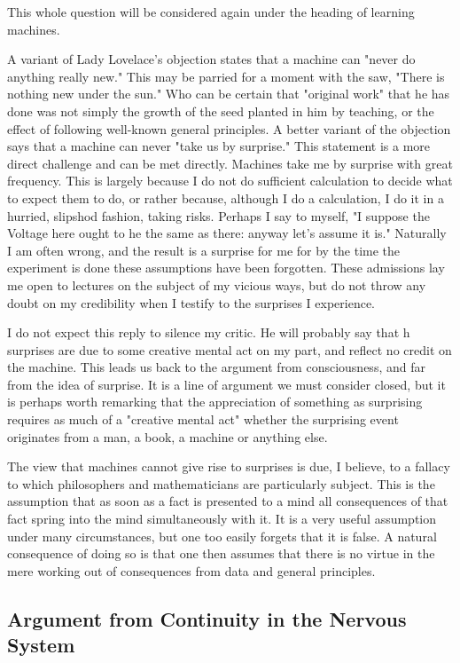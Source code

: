 \documentclass{article}
\begin{document}
This whole question will be considered again under the heading of learning machines.

A variant of Lady Lovelace's objection states that a machine can "never do anything really new." This may be parried for a moment with the saw, "There is nothing new under the sun." Who can be certain that "original work" that he has done was not simply the growth of the seed planted in him by teaching, or the effect of following well-known general principles. A better variant of the objection says that a machine can never "take us by surprise." This statement is a more direct challenge and can be met directly. Machines take me by surprise with great frequency. This is largely because I do not do sufficient calculation to decide what to expect them to do, or rather because, although I do a calculation, I do it in a hurried, slipshod fashion, taking risks. Perhaps I say to myself, "I suppose the Voltage here ought to he the same as there: anyway let's assume it is." Naturally I am often wrong, and the result is a surprise for me for by the time the experiment is done these assumptions have been forgotten. These admissions lay me open to lectures on the subject of my vicious ways, but do not throw any doubt on my credibility when I testify to the surprises I experience.

I do not expect this reply to silence my critic. He will probably say that h surprises are due to some creative mental act on my part, and reflect no credit on the machine. This leads us back to the argument from consciousness, and far from the idea of surprise. It is a line of argument we must consider closed, but it is perhaps worth remarking that the appreciation of something as surprising requires as much of a "creative mental act" whether the surprising event originates from a man, a book, a machine or anything else.

The view that machines cannot give rise to surprises is due, I believe, to a fallacy to which philosophers and mathematicians are particularly subject. This is the assumption that as soon as a fact is presented to a mind all consequences of that fact spring into the mind simultaneously with it. It is a very useful assumption under many circumstances, but one too easily forgets that it is false. A natural consequence of doing so is that one then assumes that there is no virtue in the mere working out of consequences from data and general principles.


\subsection{Argument from Continuity in the Nervous System}
\end{document}
